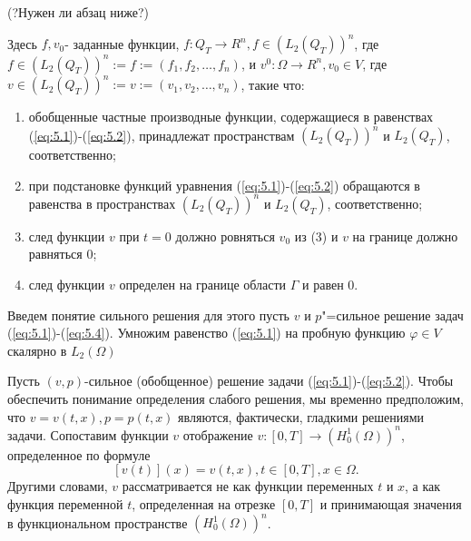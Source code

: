 (?Нужен ли абзац ниже?)

Здесь $f,v_0$- заданные функции, $f:Q_T\rightarrow R^n, f\in (L_2(Q_T))^n$, где $f\in (L_2(Q_T))^n:={f:=(f_1,f_2,\dots,f_n)}$,
и $v^0:\Omega\rightarrow R^n,v_0\in V$, где $v\in (L_2(Q_T))^n:={v:=(v_1,v_2,\dots,v_n)}$, такие что:
\begin{enumerate} 
    \item обобщенные частные производные функции, содержащиеся в равенствах (\ref{eq:5.1})-(\ref{eq:5.2}), принадлежат пространствам $(L_2(Q_T))^n$ и $L_2(Q_T)$, соответственно;
    \item при подстановке функций уравнения (\ref{eq:5.1})-(\ref{eq:5.2}) обращаются в равенства в пространствах $(L_2(Q_T))^n$ и $L_2(Q_T)$, соответственно;
    \item след функции $v$ при $t=0$ должно ровняться $v_0$ из (3) и $v$ на границе должно равняться $0$;
    \item след функции $v$ определен на границе области $\Gamma$ и равен 0.
\end{enumerate}

Введем понятие сильного решения для этого пусть $v$ и $p$"=сильное решение задач (\ref{eq:5.1})-(\ref{eq:5.4}).
Умножим равенство (\ref{eq:5.1}) на пробную функцию $\varphi\in V$ скалярно в $L_2(\Omega)$

Пусть $(v,p)$-сильное (обобщенное) решение задачи (\ref{eq:5.1})-(\ref{eq:5.2}).
Чтобы обеспечить понимание определения слабого решения, мы временно предположим, что $v=v(t,x), p=p(t,x)$ являются, фактически, гладкими решениями задачи.
Сопоставим функции $v$ отображение $v:[0,T]\rightarrow (H^{1}_0(\Omega))^n$, определенное по формуле $$[v(t)](x)=v(t,x), t\in[0,T], x\in\Omega.$$
Другими словами, $v$ рассматривается не как функции переменных $t$ и $x$, а как функция переменной $t$, определенная на отрезке
$[0,T]$ и принимающая значения в функциональном пространстве $(H^{1}_0(\Omega))^n$.

